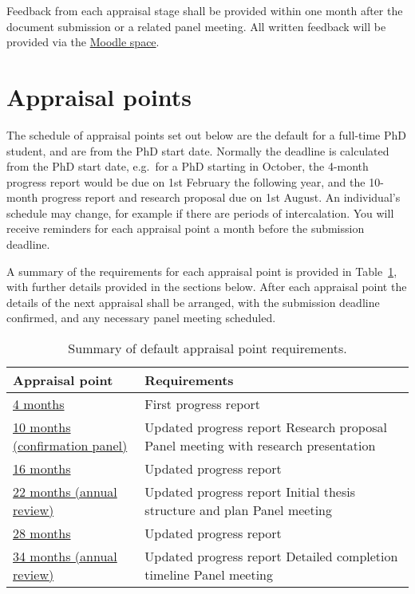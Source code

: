 \documentclass[12pt,a4paper]{article}
\begin{document}
Feedback from each appraisal stage shall be provided within one month after the document submission or a related panel meeting. All written feedback will be provided via the \href{https://modules.lancaster.ac.uk/course/view.php?id=7050}{Moodle space}.

\section{Appraisal points} \label{sec:points}

The schedule of appraisal points set out below are the default for a full-time PhD student, and are from the PhD start date. Normally the deadline is calculated from the PhD start date, e.g.\ for a PhD starting in October, the 4-month progress report would be due on 1st February the following year, and the 10-month progress report and research proposal due on 1st August. An individual's schedule may change, for example if there are periods of intercalation. You will receive reminders for each appraisal point a month before the submission deadline.

A summary of the requirements for each appraisal point is provided in Table~\ref{table:points}, with further details provided in the sections below. After each appraisal point the details of the next appraisal shall be arranged, with the submission deadline confirmed, and any necessary panel meeting scheduled.

\begin{table}[ht]
	\centering
	\begin{tabular}{p{}p{}}
	\textbf{Appraisal point} & \textbf{Requirements} \\
	\hline 
	\hyperref[sec:4months]{4 months} &	First progress report\\
	\hline
	\hyperref[sec:10months]{10 months \newline(confirmation panel)} &	Updated progress report \newline Research proposal \newline Panel meeting with research presentation \\ 
	\hline
	\hyperref[sec:16months]{16 months} & Updated progress report \\ 
	\hline
	\hyperref[sec:22months]{22 months \newline(annual review)} & Updated progress report \newline Initial thesis structure and plan \newline Panel meeting \\ 
	\hline
	\hyperref[sec:28months]{28 months} & Updated progress report \\ \hline
	\hyperref[sec:34months]{34 months \newline(annual review)} & Updated progress report \newline Detailed completion timeline \newline Panel meeting \\ 
	\end{tabular}
\caption{Summary of default appraisal point requirements.}
\label{table:points}
\end{table}
\end{document}
